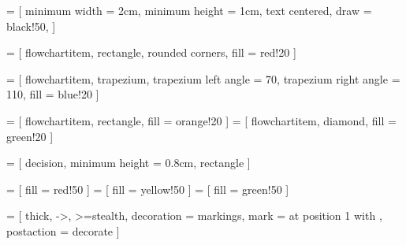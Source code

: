 \usepackage{tikz}
\usepackage{tkz-euclide}
\usetikzlibrary{shapes.geometric, arrows}
\usepackage{tikz-qtree}

 = [
	minimum width = 2cm,
	minimum height = 1cm,
	text centered,
	draw = black!50,
]

 = [
	flowchartitem,
	rectangle,
	rounded corners,
	fill = red!20
]
 
 = [
	flowchartitem,
	trapezium,
	trapezium left angle = 70,
	trapezium right angle = 110,
	fill = blue!20
]

 = [
	flowchartitem,
	rectangle,
	fill = orange!20
]
 = [
	flowchartitem,
	diamond,
	fill = green!20
]

 = [
	decision,
	minimum height = 0.8cm,
	rectangle
]

 = [ fill = red!50 ]
 = [ fill = yellow!50 ]
 = [ fill = green!50 ]

\newenvironment*{tikzfigure}[1][]{
	\begin{figure}[h!]
	\begin{tikzfigureinternal}[#1]
}{
	\end{tikzfigureinternal}
	\end{figure}
}

\newenvironment*{tikzsubfigure}[1][]{
	\begin{subfigure}[b]{0.45\textwidth}
	\begin{tikzfigureinternal}[#1]
}{
	\end{tikzfigureinternal}
	\end{subfigure}
}

\newenvironment*{tikzfigureinternal}[1][]{
	\centering
	\gdef\tcapt{#1}
	\begin{tikzpicture}[scale=1]
}{
	\end{tikzpicture}
	\caption{\tcapt}
}

 = [
	thick,
	->,
	>=stealth,
	decoration = {
		markings,
		mark = at position 1 with {
			\arrow[scale=2]{>}
		}
	},
	postaction = {decorate}
]

\newenvironment*{flowchart}[2]{
	\label{#1}
	\begin{tikzfigure}[#2]
	\tikzset {
		level distance = 3cm,
		grow = down,
		edge from parent/.append style = { flowchartArrow }
	}
}{
	\end{tikzfigure}
}
